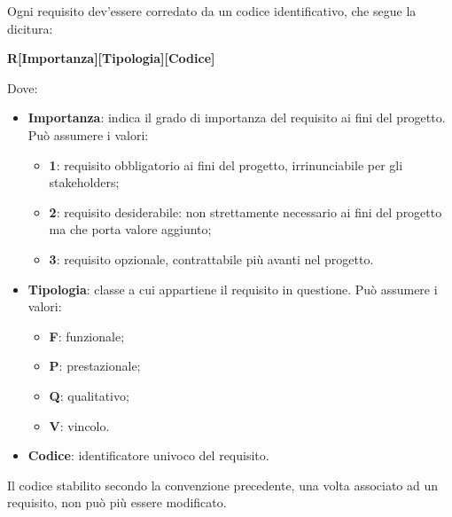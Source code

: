            	\noindent Ogni requisito dev'essere corredato da un codice identificativo, che segue la dicitura:
			\begin{center}
				\textbf{R[Importanza][Tipologia][Codice]}
			\end{center}

			Dove:
			\begin{itemize}
			   	\item{\textbf{Importanza}: indica il grado di importanza del requisito ai fini del progetto. Può assumere i valori:}
			   	\begin{itemize}
			           	\item{\textbf{1}: requisito obbligatorio ai fini del progetto, irrinunciabile per gli stakeholders;}
			           	\item{\textbf{2}: requisito desiderabile: non strettamente necessario ai fini del progetto ma che porta valore aggiunto;}
			           	\item{\textbf{3}: requisito opzionale, contrattabile più avanti nel progetto.}
			   	\end{itemize}

			   	\item{\textbf{Tipologia}: classe a cui appartiene il requisito in questione. Può assumere i valori:}
			   	\begin{itemize}
			   		\item{\textbf{F}: funzionale;}
			   		\item{\textbf{P}: prestazionale;}
			   		\item{\textbf{Q}: qualitativo;}
			   		\item{\textbf{V}: vincolo.}
			   	\end{itemize}

			   	\item{\textbf{Codice}: identificatore univoco del requisito}.
			\end{itemize}
         \noindent Il codice stabilito secondo la convenzione precedente, una volta associato ad un requisito, non può più essere modificato. \\

